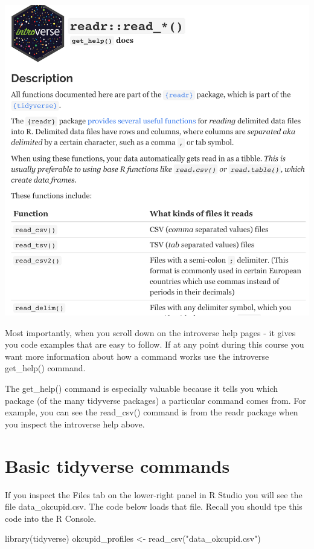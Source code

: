 \documentclass[
]{krantz}
\makeatletter
\newenvironment{Shaded}{\begin{snugshade}}{\end{snugshade}}
\newcommand{\FunctionTok}[1]{\textcolor[rgb]{0,0,0}{#1}}
\newcommand{\NormalTok}[1]{#1}
\newcommand{\OtherTok}[1]{\textcolor[rgb]{0.37,0.37,0.37}{#1}}
\newcommand{\StringTok}[1]{\textcolor[rgb]{0.5,0.5,0.5}{#1}}
\newenvironment{kframe}{%
\medskip{}
\setlength{\fboxsep}{.8em}
 \def\at@end@of@kframe{}%
 \ifinner\ifhmode%
  \def\at@end@of@kframe{\end{minipage}}%
  \begin{minipage}{\columnwidth}%
 \fi\fi%
 \def\FrameCommand##1{\hskip\@totalleftmargin \hskip-\fboxsep
 \colorbox{shadecolor}{##1}\hskip-\fboxsep
     \hskip-\linewidth \hskip-\@totalleftmargin \hskip\columnwidth}%
 \MakeFramed {\advance\hsize-\width
   \@totalleftmargin\z@ \linewidth\hsize
   \@setminipage}}%
 {\par\unskip\endMakeFramed%
 \at@end@of@kframe}
\renewenvironment{Shaded}{\begin{kframe}}{\end{kframe}}
\makeatother
\begin{document}
\includegraphics[width=0.7\linewidth]{ch_tidy_intro/images/screenshot_introverse_help}

Most importantly, when you scroll down on the introverse help pages - it gives you code examples that are easy to follow. If at any point during this course you want more information about how a command works use the introverse get\_help() command.

The get\_help() command is especially valuable because it tells you which package (of the many tidyverse packages) a particular command comes from. For example, you can see the read\_csv() command is from the readr package when you inspect the introverse help above.

\hypertarget{basic-tidyverse-commands}{%
\section{Basic tidyverse commands}\label{basic-tidyverse-commands}}

If you inspect the Files tab on the lower-right panel in R Studio you will see the file data\_okcupid.csv. The code below loads that file. Recall you should tpe this code into the R Console.

\begin{Shaded}
\begin{Highlighting}[]
\FunctionTok{library}\NormalTok{(tidyverse)}
\NormalTok{okcupid\_profiles }\OtherTok{\textless{}{-}} \FunctionTok{read\_csv}\NormalTok{(}\StringTok{"data\_okcupid.csv"}\NormalTok{)}
\end{Highlighting}
\end{Shaded}
\end{document}
